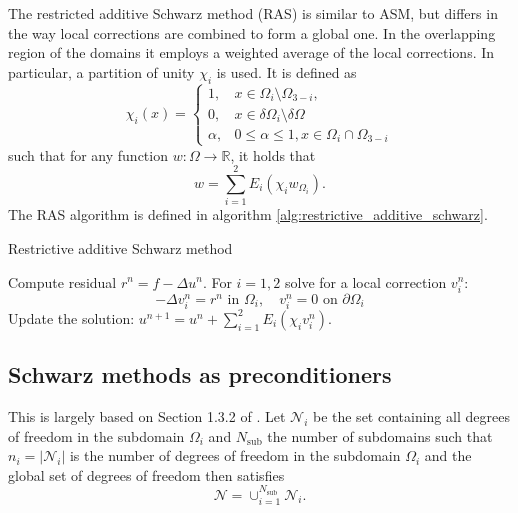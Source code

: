 The restricted additive Schwarz method (RAS) is similar to ASM, but differs in the way local corrections are combined to form a global one. In the overlapping region of the domains it employs a weighted average of the local corrections. In particular, a partition of unity $\chi_i$ is used. It is defined as
\[
    \chi_i(x)=
    \begin{cases}
        1,      & x \in \Omega_i \setminus \Omega_{3-i},                 \\
        0,      & x \in \delta \Omega_i \setminus \delta \Omega          \\
        \alpha, & 0 \leq \alpha \leq 1, x \in \Omega_i \cap \Omega_{3-i}
    \end{cases}
\]
such that for any function $w: \Omega \rightarrow \mathbb{R}$, it holds that
\[
    w = \sum_{i=1}^{2}E_i(\chi_i w_{\Omega_i}).
\]
The RAS algorithm is defined in algorithm \ref{alg:restrictive_additive_schwarz}.
\begin{algorithm}[H]
    \caption{Restrictive additive Schwarz method \cite[Algorithm 1.1]{schwarz_methods_Dolean_2015}}
    \label{alg:restrictive_additive_schwarz}
    \begin{algorithmic}
        \State Compute residual $r^n=f-\Delta u^n$.
        \State For $i=1,2$ solve for a local correction $v_i^n$:
        \[
            -\Delta v_i^n=r^n \text{ in } \Omega_i, \quad v_i^n=0 \text{ on } \partial \Omega_i
        \]
        \State Update the solution: $u^{n+1}=u^n + \sum_{i=1}^{2}E_i(\chi_i v_i^n)$.
    \end{algorithmic}
\end{algorithm}


\subsection{Schwarz methods as preconditioners}
This is largely based on Section 1.3.2 of \cite{schwarz_methods_Dolean_2015}. Let  $\mathcal{N}_i$ be the set containing all degrees of freedom in the subdomain $\Omega_i$ and $N_{\text{sub}}$ the number of subdomains such that $n_i = |\mathcal{N}_i|$ is the number of degrees of freedom in the subdomain $\Omega_i$ and the global set of degrees of freedom then satisfies
\[
    \mathcal{N}=\cup_{i=1}^{N_{\text{sub}}} \mathcal{N}_i.
\]
  
